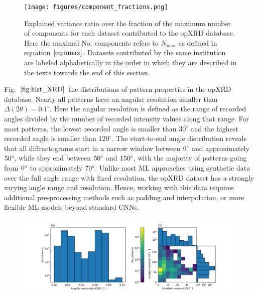 \begin{figure}[!htb]
    \centering\texttt{[image: figures/component\_fractions.png]}
    \caption{Explained variance ratio over the fraction of the maximum number of components for each dataset contributed to the opXRD database. Here the maximal No. components refers to $N_{\text{max}}$ as defined in equation $\eqref{eq:nmax}$. Datasets contributed by the same institution are labeled alphabetically in the order in which they are described in the texts towards the end of this section.}
    \label{fig:components}
\end{figure}

Fig.~$\eqref{fig:hist_XRD}$  the distributions of pattern  properties in the opXRD database. Nearly all patterns have an angular resolution smaller than $\Delta(2\theta) = 0.1 ^\circ$. Here the angular resolution is defined as the range of recorded angles divided by the number of recorded intensity values along that range. For most patterns, the lowest recorded angle is smaller than $30 ^\circ$ and the highest recorded angle is smaller than $120 ^\circ$. The start-to-end angle distribution reveals that all diffractograms start in a narrow window between $0\degree$ and approximately $50\degree$, while they end between $50\degree$ and $150\degree$, with the majority of patterns going from $0\degree$ to approximately $70\degree$. Unlike most ML approaches using synthetic data over the full angle range with fixed resolution, the opXRD dataset has a strongly varying angle range and resolution. Hence, working with this data requires additional pre-processing methods such as padding and interpolation, or more flexible ML models beyond standard CNNs.


\begin{figure}[!htb]
    \centering
    \includegraphics[width=\linewidth]{figures/hist_XRD.png}
    \caption{}
    \label{fig:hist_XRD}
\end{figure}

